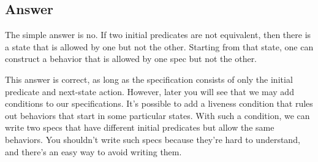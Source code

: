 \documentclass[fleqn,leqno]{article}
\begin{document}
\subsection*{Answer}

The simple answer is no.  If two initial predicates are not
equivalent, then there is a state that is allowed by one but not the
other.  Starting from that state, one can construct a behavior that is
allowed by one spec but not the other.

This answer is correct, as long as the specification consists of only
the initial predicate and next-state action.  However, later you will
see that we may add  conditions
to our specifications.  It's possible to add a liveness condition that
rules out behaviors that start in some particular states.  With such a
condition, we can write two specs that have different initial
predicates but allow the same behaviors.  You shouldn't write such
specs because they're hard to understand, and there's an easy way to
avoid writing them.
\end{document}
